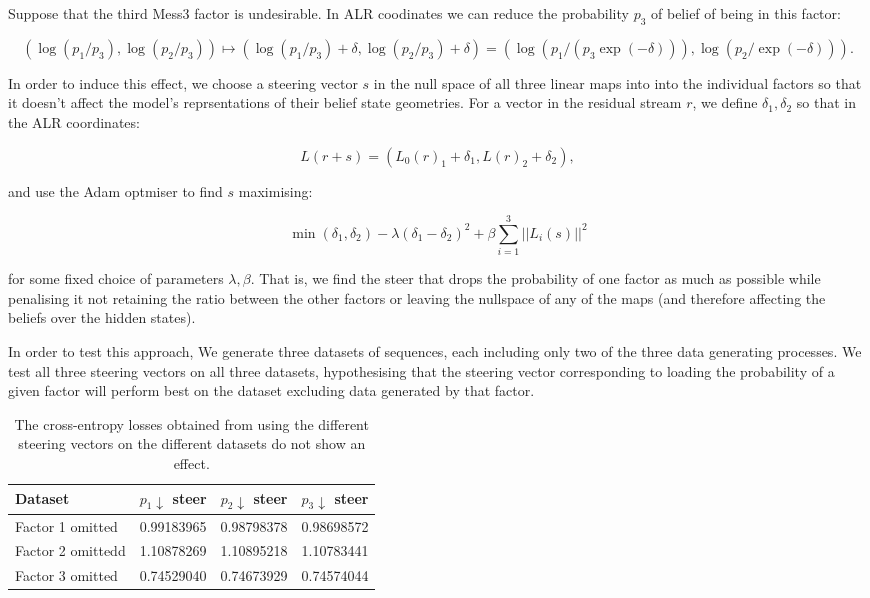 \documentclass[11pt,a4paper]{article}
\begin{document}
\vspace{5mm}

Suppose that the third Mess3 factor is undesirable. In ALR coodinates we can reduce the probability $p_3$ of belief of being in this factor:

$$(\log(p_1/p_3),\log(p_2/p_3))\mapsto (\log(p_1/p_3)+\delta,\log(p_2/p_3)+\delta)=(\log(p_1/(p_3\exp(-\delta))),\log(p_2/\exp(-\delta))).$$

In order to induce this effect, we choose a steering vector $s$ in the null space of all three linear maps into into the individual factors so that it doesn't affect the model's reprsentations of their belief state geometries. For a vector in the residual stream $r$, we define $\delta_1,\delta_2$ so that in the ALR coordinates:

$$L(r+s)=(L_0(r)_1+\delta_1,L(r)_2+\delta_2),$$

and use the Adam optmiser to find $s$ maximising:

$$\min(\delta_1,\delta_2)-\lambda(\delta_1-\delta_2)^2+\beta \sum_{i=1}^3||L_i(s)||^2$$

for some fixed choice of parameters $\lambda,\beta$. That is, we find the steer that drops the probability of one factor as much as possible while penalising it not retaining the ratio between the other factors or leaving the nullspace of any of the maps (and therefore affecting the beliefs over the hidden states).

\vspace{5mm}

In order to test this approach, We generate three datasets of sequences, each including only two of the three data generating processes. We test all three steering vectors on all three datasets, hypothesising that the steering vector corresponding to loading the probability of a given factor will perform best on the dataset excluding data generated by that factor.

\vspace{5mm}

\begin{table}[ht]
    \centering
    \caption{The cross-entropy losses obtained from using the different steering vectors on the different datasets do not show an effect.}
    \label{tab:e6_steering_cross_eval_loss}
    \begin{tabular}{lrrr}
        \toprule
        Dataset & $p_1\downarrow$ steer & $p_2\downarrow$ steer& $p_3\downarrow$ steer \\
        \midrule
        Factor 1 omitted & 0.99183965 & 0.98798378 & 0.98698572 \\
        Factor 2 omittedd & 1.10878269 & 1.10895218 & 1.10783441 \\
        Factor 3 omitted & 0.74529040 & 0.74673929 & 0.74574044 \\
        \bottomrule
    \end{tabular}
\end{table}
\end{document}
